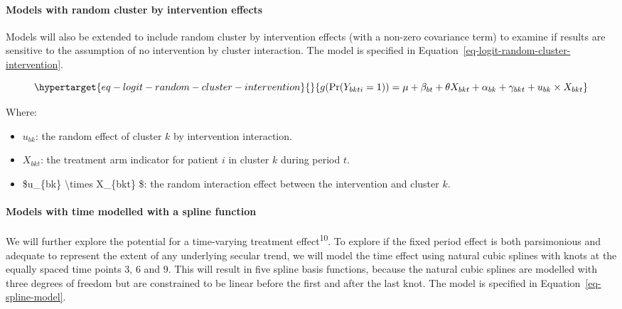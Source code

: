 \documentclass[
]{scrartcl}
\let\oldparagraph\paragraph
\renewcommand{\paragraph}[1]{\oldparagraph{#1}\mbox{}}
\providecommand{\tightlist}{%
  \setlength{\itemsep}{0pt}\setlength{\parskip}{0pt}}\usepackage{longtable,booktabs,array}
\begin{document}
\hypertarget{models-with-random-cluster-by-intervention-effects}{%
\paragraph{Models with random cluster by intervention
effects}\label{models-with-random-cluster-by-intervention-effects}}

Models will also be extended to include random cluster by intervention
effects (with a non-zero covariance term) to examine if results are
sensitive to the assumption of no intervention by cluster interaction.
The model is specified in
Equation~\ref{eq-logit-random-cluster-intervention}.

\begin{equation}\protect\hypertarget{eq-logit-random-cluster-intervention}{}{
g(\text{Pr}(Y_{bkti} = 1)) = \mu + \beta_{bt} + \theta X_{bkt} + \alpha_{bk} + \gamma_{bkt} + u_{bk} \times X_{bkt}
}\label{eq-logit-random-cluster-intervention}\end{equation}

Where:

\begin{itemize}
\tightlist
\item
  \(u_{bk}\): the random effect of cluster \(k\) by intervention
  interaction.
\item
  \(X_{bkt}\): the treatment arm indicator for patient \(i\) in cluster
  \(k\) during period \(t\).
\item
  \$u\_\{bk\} \textbackslash times X\_\{bkt\} \$: the random interaction
  effect between the intervention and cluster \(k\).
\end{itemize}

\hypertarget{models-with-time-modelled-with-a-spline-function}{%
\paragraph{Models with time modelled with a spline
function}\label{models-with-time-modelled-with-a-spline-function}}

We will further explore the potential for a time-varying treatment
effect\textsuperscript{10}. To explore if the fixed period effect is
both parsimonious and adequate to represent the extent of any underlying
secular trend, we will model the time effect using natural cubic splines
with knots at the equally spaced time points 3, 6 and 9. This will
result in five spline basis functions, because the natural cubic splines
are modelled with three degrees of freedom but are constrained to be
linear before the first and after the last knot. The model is specified
in Equation~\ref{eq-spline-model}.
\end{document}
